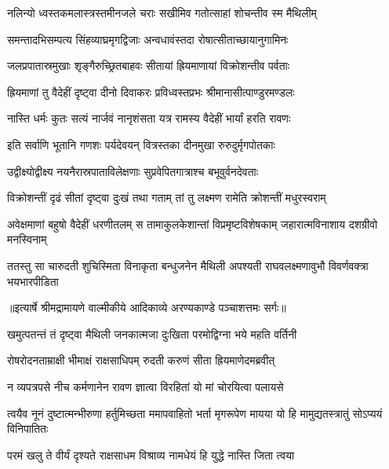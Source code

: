 \twolineshloka
{नलिन्यो ध्वस्तकमलास्त्रस्तमीनजले चराः}
{सखीमिव गतोत्साहां शोचन्तीव स्म मैथिलीम्} %

\twolineshloka
{समन्तादभिसम्पत्य सिंहव्याघ्रमृगद्विजाः}
{अन्वधावंस्तदा रोषात्सीताच्छायानुगामिनः} %

\twolineshloka
{जलप्रपातास्रमुखाः शृङ्गैरुच्छ्रितबाहवः}
{सीतायां ह्रियमाणायां विक्रोशन्तीव पर्वताः} %

\twolineshloka
{ह्रियमाणां तु वैदेहीं दृष्ट्वा दीनो दिवाकरः}
{प्रविध्वस्तप्रभः श्रीमानासीत्पाण्डुरमण्डलः} %

\twolineshloka
{नास्ति धर्मः कुतः सत्यं नार्जवं नानृशंसता}
{यत्र रामस्य वैदेहीं भार्यां हरति रावणः} %

\twolineshloka
{इति सर्वाणि भूतानि गणशः पर्यदेवयन्}
{वित्रस्तका दीनमुखा रुरुदुर्मृगपोतकाः} %

\twolineshloka
{उद्वीक्ष्योद्वीक्ष्य नयनैरास्रपाताविलेक्षणाः}
{सुप्रवेपितगात्राश्च बभूवुर्वनदेवताः} %

\twolineshloka
{विक्रोशन्तीं दृढं सीतां दृष्ट्वा दुःखं तथा गताम्}
{तां तु लक्ष्मण रामेति क्रोशन्तीं मधुरस्वराम्} %

\threelineshloka
{अवेक्षमाणां बहुषो वैदेहीं धरणीतलम्}
{स तामाकुलकेशान्तां विप्रमृष्टविशेषकाम्}
{जहारात्मविनाशाय दशग्रीवो मनस्विनाम्} %

\fourlineindentedshloka
{ततस्तु सा चारुदती शुचिस्मिता}
{विनाकृता बन्धुजनेन मैथिली}
{अपश्यती राघवलक्ष्मणावुभौ}
{विवर्णवक्त्रा भयभारपीडिता} %


{॥इत्यार्षे श्रीमद्रामायणे वाल्मीकीये आदिकाव्ये अरण्यकाण्डे पञ्चाशत्तमः सर्गः॥}


\twolineshloka
{खमुत्पतन्तं तं दृष्ट्वा मैथिली जनकात्मजा}
{दुःखिता परमोद्विग्ना भये महति वर्तिनी} %

\twolineshloka
{रोषरोदनताम्राक्षी भीमाक्षं राक्षसाधिपम्}
{रुदती करुणं सीता ह्रियमाणेदमब्रवीत्} %

\twolineshloka
{न व्यपत्रपसे नीच कर्मणानेन रावण}
{ज्ञात्वा विरहितां यो मां चोरयित्वा पलायसे} %

\threelineshloka
{त्वयैव नूनं दुष्टात्मन्भीरुणा हर्तुमिच्छता}
{ममापवाहितो भर्ता मृगरूपेण मायया}
{यो हि मामुद्यतस्त्रातुं सोऽप्ययं विनिपातितः} %

\twolineshloka
{परमं खलु ते वीर्यं दृश्यते राक्षसाधम}
{विश्राव्य नामधेयं हि युद्धे नास्ति जिता त्वया} %

